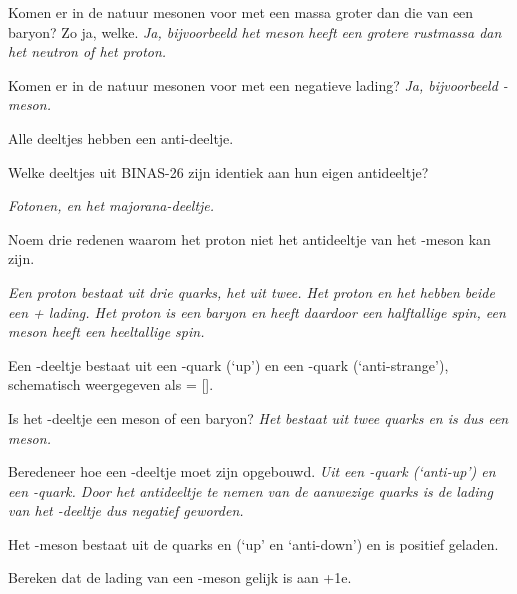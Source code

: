 \begin{opdrachten}
\begin{opdrachten}
    \item  Komen er in de natuur mesonen voor met een massa groter dan
    die van een baryon? Zo ja, welke. 
    \textit{Ja, bijvoorbeeld het \PD meson heeft een grotere rustmassa 
    dan het neutron of het proton.}

    \item Komen er in de natuur mesonen voor met een negatieve lading?
    \textit{Ja, bijvoorbeeld \Ppiminus-meson.} 
    \end{opdrachten} 
    
\item Alle deeltjes hebben een anti-deeltje.
    \begin{opdrachten} 
    \item  Welke deeltjes uit BINAS-26 zijn identiek aan hun eigen antideeltje?

    \textit{Fotonen, \Ppizero en het majorana-deeltje.}

    \item Noem drie redenen waarom het proton niet het antideeltje van het \Ppiplus-meson kan zijn.

    \textit {Een proton bestaat uit drie quarks, het \Ppiplus uit twee.
    Het proton en het \Ppiplus hebben beide een + lading.
    Het proton is een baryon en heeft daardoor een halftallige spin, een meson 
    heeft een heeltallige spin. }
    \end{opdrachten}
    
\item  Een \PKplus -deeltje bestaat uit een \Pup -quark (`up') en een
    \APqs-quark (`anti-strange'), schematisch weergegeven als \PKplus =
    [\Pup\APqs]. 
    \begin{opdrachten} 
    \item Is het \PKplus -deeltje een meson of een baryon?
    \textit{Het \PKplus bestaat uit twee quarks en is dus een meson.}

    \item Beredeneer hoe een \PKm-deeltje moet zijn opgebouwd. 
    \textit{Uit een \APup -quark (`anti-up') en een \Pqs-quark. Door het antideeltje te
    nemen van de aanwezige quarks is de lading van het \PKm-deeltje dus
    negatief geworden.}
    \end{opdrachten}
    
\item Het \Ppiplus-meson bestaat uit de quarks \Pup en \APdown  (`up' en `anti-down')
en is positief geladen.

    \begin{opdrachten} 
    \item Bereken dat de lading van een \Ppiplus-meson gelijk is aan +1e.


\end{opdrachten}
\end{opdrachten}

